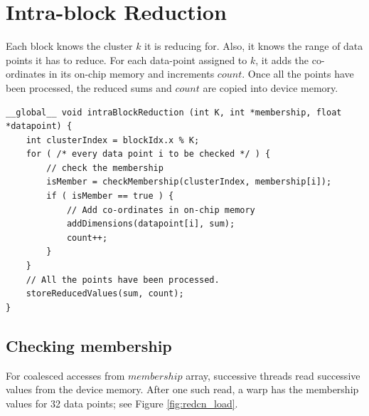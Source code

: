 \section{Intra-block Reduction}
Each block knows the cluster $k$ it is reducing for. Also, it knows the range of data points it has to reduce. For each data-point assigned to $k$, it adds the co-ordinates in its on-chip memory and increments $count$. Once all the points have been processed, the reduced sums and $count$ are copied into device memory.
\begin{lstlisting}[breaklines=true, morekeywords={blockIdx}]
__global__ void intraBlockReduction (int K, int *membership, float *datapoint) {
	int clusterIndex = blockIdx.x % K;
	for ( /* every data point i to be checked */ ) {
		// check the membership
		isMember = checkMembership(clusterIndex, membership[i]);
		if ( isMember == true ) {
			// Add co-ordinates in on-chip memory 		
			addDimensions(datapoint[i], sum);
			count++;
		}
	}
	// All the points have been processed.
	storeReducedValues(sum, count);
}
\end{lstlisting}
\subsection{Checking membership}
For coalesced accesses from $membership$ array, successive threads read successive values from the device memory. After one such read, a warp has the membership values for 32 data points; see Figure \ref{fig:redcn_load}.


